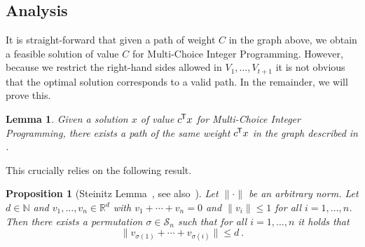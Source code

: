 \documentclass{article}
\newcommand*{\T}{^{\mkern-1.5mu\mathsf{T}}}
\newcommand{\N}{\mathbb{N}}
\newcommand{\R}{\mathbb{R}}
\newtheorem{lemma}[theorem]{Lemma}
\newtheorem{proposition}[theorem]{Proposition}
\begin{document}
\subsection{Analysis}
It is straight-forward that given a path of weight $C$ in the graph above, we obtain a feasible solution
of value $C$ for Multi-Choice Integer Programming.
However, because we restrict the right-hand sides allowed in $V_1,\dotsc,V_{t+1}$
it is not obvious that the optimal solution corresponds to a valid path.
In the remainder, we will prove this.
\begin{lemma}\label{lem:steinitz-path}
Given a solution $x$ of value $c\T x$ for Multi-Choice Integer Programming, there exists a path of 
	the same weight $c\T x$ in the graph described in .
\end{lemma}
This crucially relies on the following result.
\begin{proposition}[Steinitz Lemma~\cite{sevast1978approximate}, see also~\cite{eisenbrand2019proximity}]
	Let $\| \cdot \|$ be an arbitrary norm.
	Let $d\in\N$ and $v_1,\dotsc,v_n\in \R^d$ with $v_1 + \cdots + v_n = 0$ and $\| v_i \| \le 1$ for all $i=1,\dotsc,n$.
	Then there exists a permutation $\sigma \in \mathcal S_n$ such that for all $i = 1,\dotsc,n$ it holds that
	\begin{equation*}
		\| v_{\sigma(1)} + \cdots + v_{\sigma(i)} \| \le d \ .
	\end{equation*}
\end{proposition}
\end{document}
